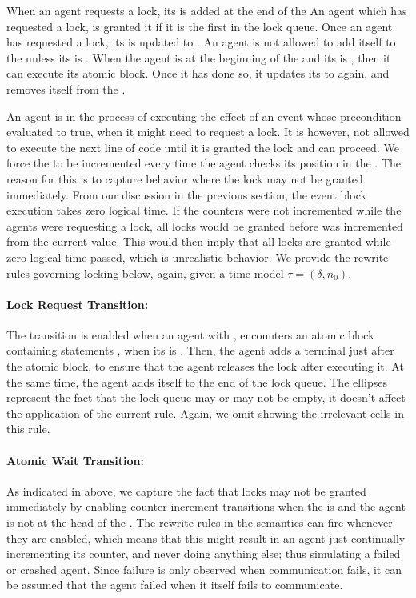 When an agent requests a lock, its  is added at the end of the  An agent which has requested a lock, is granted it if it is the first in the lock queue. Once an agent has requested a lock, its  is updated to . An agent is not allowed to add itself to the  unless its  is . When the agent is at the beginning of the  and its  is , then it can execute its atomic block. Once it has done so, it updates its  to  again, and removes itself from the . 

An agent is in the process of executing the effect of an event whose precondition evaluated to true, when it might need to request a lock. It is however, not allowed to execute the next line of code until it is granted the lock and can proceed. We force the  to be incremented every time the agent checks its position in the . The reason for this is to capture behavior where the lock may not be granted immediately. From our discussion in the previous section, the event block execution takes zero logical time. If the counters were not incremented while the agents were requesting a lock, all locks would be granted before  was incremented from the current value. This would then imply that all locks are granted while zero logical time passed, which is unrealistic behavior. We provide the rewrite rules governing locking below, again, given a time model $\tau = (\delta,n_0)$. 

\paragraph{Lock Request Transition:} The  transition is enabled when an agent with  , encounters an atomic block containing statements , when its  is . Then, the agent adds a terminal  just after the atomic block, to ensure that the agent releases the lock after executing it. At the same time, the agent adds itself to the end of the lock queue. The ellipses represent the fact that the lock queue may or may not be empty, it doesn't affect the application of the current rule. Again, we omit showing the irrelevant cells in this rule. 

\paragraph{Atomic Wait Transition:} As indicated in above, we capture the fact that locks may not be granted immediately by enabling counter increment transitions when the  is  and the agent  is not at the head of the . The rewrite rules in the semantics can fire whenever they are enabled, which means that this might result in an agent just continually incrementing its counter, and never doing anything else; thus simulating a failed or crashed agent. Since failure is only observed when communication fails, it can be assumed that the agent failed when it itself fails to communicate. 

